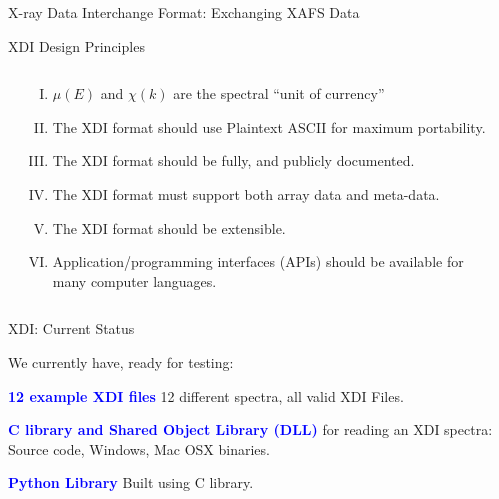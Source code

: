 \documentclass[final]{beamer}
\newcommand{\Color}[2]{{\textcolor{#1}{#2}}}
\newcommand{\Blue}[1]{{\Color{Blue}{\bf{#1}}}}
\begin{document}
\begin{frame}{}
\begin{columns}[t]
\begin{column}{.55\linewidth}
\begin{block}{\large  X-ray Data Interchange Format:  Exchanging
            XAFS Data}
          \begin{block}{\large XDI Design Principles}

           \begin{columns}[T]
             \begin{column}{0.05\linewidth}    \end{column}
             \begin{column}{0.90\linewidth}

            \begin{enumerate}[I.] \normalsize
            \item $\mu(E)$ and $\chi(k)$ are the spectral ``unit of  currency''
            \item The XDI format should use Plaintext ASCII for maximum portability.
            \item The XDI format should be fully, and publicly documented.
            \item The XDI format must support both array data and meta-data.
            \item The XDI format should be extensible.
            \item Application/programming interfaces (APIs) should be
              available for many computer languages.
            \end{enumerate}

             \end{column}
             \begin{column}{0.05\linewidth}    \end{column}
             \end{columns}          \end{block}
        \end{block}

        \vspace{2mm}

      \begin{block}{\large XDI: Current Status}

        We currently have, ready for testing:
        \begin{center}
          \begin{minipage}{0.9\linewidth}
            \begin{description}[A]
            \item {\Blue{12 example XDI files}} 12 different spectra, all valid  XDI Files.
            \item {\Blue{C library and Shared Object Library (DLL)}}  for
              reading an XDI spectra:  Source code, Windows, Mac OSX binaries.
            \item {\Blue{Python Library}}  Built using C library.
            \end{description}
            \end{minipage}
            \end{center}


\end{block}
\end{column}
\end{columns}
\end{frame}
\end{document}
